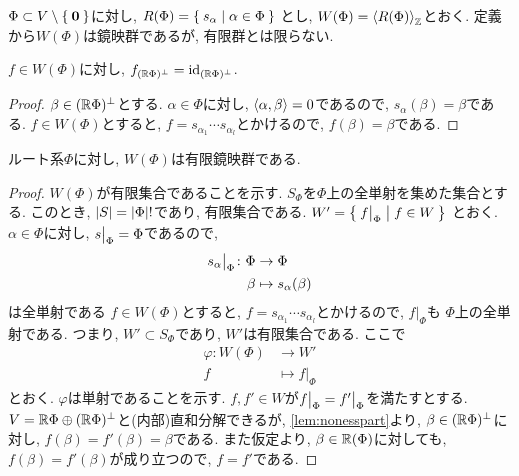 $\Phi\subset V\setminus \Set{\boldsymbol{0}}$に対し,
$R(\Phi)=\Set{s_\alpha | \alpha \in \Phi}$
とし,
$W(\Phi)=\Braket{R(\Phi)}_{\mathbb{Z}}$とおく.
定義から$W(\Phi)$は鏡映群であるが, 有限群とは限らない.

\begin{lemma}
  \label{lem:nonesspart}
  $f\in W(\Phi)$に対し,
  $f_{(\mathbb{R}\Phi)^{\perp}}=\operatorname{id}_{(\mathbb{R}\Phi)^{\perp}}$.
\end{lemma}
\begin{proof}
  $\beta\in (\mathbb{R}\Phi)^{\perp}$とする.
  $\alpha\in \Phi$に対し,
  $\Braket{\alpha,\beta}=0$であるので,
  $s_{\alpha}(\beta)=\beta$である.
  $f\in W(\Phi)$とすると,
  $f=s_{\alpha_1}\cdots s_{\alpha_l}$とかけるので,  
  $f(\beta)=\beta$である.
\end{proof}

\begin{prop}
ルート系$\Phi$に対し,
$W(\Phi)$は有限鏡映群である.
\end{prop}
\begin{proof}
  $W(\Phi)$が有限集合であることを示す.
  $S_\Phi$を$\Phi$上の全単射を集めた集合とする.
  このとき, $\left|S\right|=\left|\Phi\right|!$であり,
  有限集合である.
  $W'=\Set{f\bigr|_{\Phi}|f \in W}$
  とおく.
  $\alpha\in\Phi$に対し, $s\bigr|_{\Phi}=\Phi$であるので,
  \begin{align*}
    s_\alpha\bigr|_{\Phi}\colon
    \Phi &\to \Phi \\
    \beta&\mapsto s_\alpha(\beta)
  \end{align*}
  は全単射である
  $f\in W(\Phi)$とすると,
  $f=s_{\alpha_1}\cdots s_{\alpha_l}$とかけるので,
  $f|_\Phi$も
  $\Phi$上の全単射である.
  つまり, $W'\subset S_\Phi$であり, $W'$は有限集合である.
  ここで
  \begin{align*}
     \varphi\colon
     W(\Phi) &\to W' \\
     f&\mapsto f|_{\Phi}
  \end{align*}
  とおく.
  $\varphi$は単射であることを示す.
  $f,f'\in W$が$f\bigr|_{\Phi}=f'\bigr|_{\Phi}$を満たすとする.
  $V=\mathbb{R}\Phi \oplus (\mathbb{R}\Phi)^\perp$と(内部)直和分解できるが,
  \cref{lem:nonesspart}より,
  $\beta\in (\mathbb{R}\Phi)^\perp$に対し,
  $f(\beta)=f'(\beta)=\beta$である.
  また仮定より, $\beta\in \mathbb{R}(\Phi)$に対しても,
  $f(\beta)=f'(\beta)$が成り立つので,
  $f=f'$である.
\end{proof}

